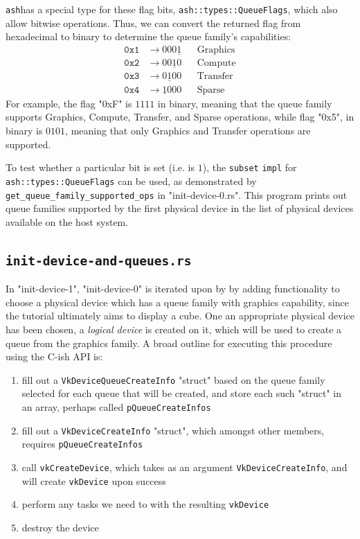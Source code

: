 \documentclass[12pt,letterpaper]{article}
\newcommand{\ril}[1]{\texttt{#1}}
\newcommand{\cil}[1]{\texttt{#1}}
\newcommand{\ash}{\texttt{ash}}
\begin{document}
	\ash has a special type for these flag bits, \ril{ash::types::QueueFlags}, which also allow bitwise operations. Thus, we can convert the returned flag from hexadecimal to binary to determine the queue family's capabilities:
    	\begin{align*}
    		\mathtt{0x1} &\rightarrow 000\underline{1} && \text{Graphics}\\
    		\mathtt{0x2} &\rightarrow 00\underline{1}0 && \text{Compute}\\
    		\mathtt{0x3} &\rightarrow 0\underline{1}00 && \text{Transfer}\\
    		\mathtt{0x4} &\rightarrow \underline{1}000 && \text{Sparse}
    	\end{align*}
     For example, the flag "0xF" is $1111$ in binary, meaning that the queue family supports Graphics, Compute, Transfer, and Sparse operations, while flag "0x5", in binary is $0101$, meaning that only Graphics and Transfer operations are supported.
         
	To test whether a particular bit is set (i.e. is $1$), the \ril{subset} \ril{impl} for \ril{ash::types::QueueFlags} can be used, as demonstrated by  \ril{get_queue_family_supported_ops} in "init-device-0.rs". This program prints out queue families supported by the first physical device in the list of physical devices available on the host system.
		
\subsection{\texttt{init-device-and-queues.rs}}
	In "init-device-1", "init-device-0" is iterated upon by by adding functionality to choose a physical device which has a queue family with graphics capability, since the tutorial ultimately aims to display a cube. One an appropriate physical device has been chosen, a \emph{logical device} is created on it, which will be used to create a queue from the graphics family. A broad outline for executing this procedure using the C-ish API is:
		\begin{enumerate}
			\item fill out a \cil{VkDeviceQueueCreateInfo} "struct" based on the queue family selected for each queue that will be created, and store each such "struct" in an array, perhaps called \cil{pQueueCreateInfos}
				
			\item fill out a \cil{VkDeviceCreateInfo} "struct", which amongst other members, requires \cil{pQueueCreateInfos}
                
			\item call \cil{vkCreateDevice}, which takes as an argument \cil{VkDeviceCreateInfo}, and will create \cil{vkDevice} upon success
				
			\item perform any tasks we need to with the resulting \cil{vkDevice}
				
			\item destroy the device
		\end{enumerate}
		
\end{document}
